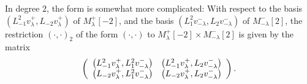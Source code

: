 \documentclass[etingof-lie.tex]{subfiles}
\begin{document}
\begin{example}
In degree $2$, the form is somewhat more complicated: With respect to the
basis $\left(  L_{-1}^{2}v_{\lambda}^{+},L_{-2}v_{\lambda}^{+}\right)  $ of
$M_{\lambda}^{+}\left[  -2\right]  $, and the basis $\left(  L_{1}%
^{2}v_{-\lambda}^{-},L_{2}v_{-\lambda}^{-}\right)  $ of $M_{-\lambda}%
^{-}\left[  2\right]  $, the restriction $\left(  \cdot,\cdot\right)  _{2}$ of
the form $\left(  \cdot,\cdot\right)  $ to $M_{\lambda}^{+}\left[  -2\right]
\times M_{-\lambda}^{-}\left[  2\right]  $ is given by the matrix%
\[
\left(
\begin{array}
[c]{cc}%
\left(  L_{-1}^{2}v_{\lambda}^{+},L_{1}^{2}v_{-\lambda}^{-}\right)  & \left(
L_{-1}^{2}v_{\lambda}^{+},L_{2}v_{-\lambda}^{-}\right) \\
\left(  L_{-2}v_{\lambda}^{+},L_{1}^{2}v_{-\lambda}^{-}\right)  & \left(
L_{-2}v_{\lambda}^{+},L_{2}v_{-\lambda}^{-}\right)
\end{array}
\right)  .
\]



\end{example}
\end{document}
